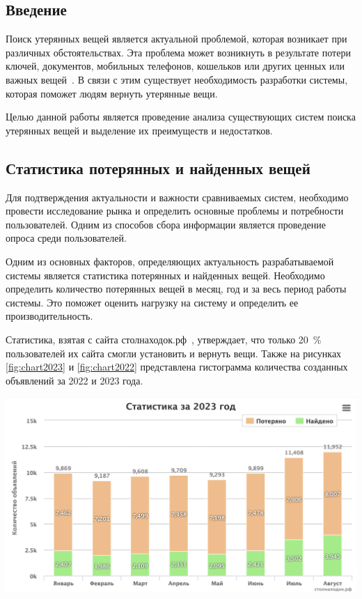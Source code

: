 \documentclass{mirea-article}
\newenvironment{Figure}
{\par\medskip\noindent\minipage{\linewidth}}
{\endminipage\par\medskip}
\begin{document}
	\begin{multicols}{2}
		
		
		\subsection*{Введение}
		\label{sec:introduction}
		
		Поиск утерянных вещей является актуальной проблемой, которая возникает при различных обстоятельствах. Эта проблема может возникнуть в результате потери ключей, документов, мобильных телефонов, кошельков или других ценных или важных вещей~\cite{bib:m24_losts_article,bib:usinsk_losts_article}. В связи с этим существует необходимость разработки системы, которая поможет людям вернуть утерянные вещи.
		
		Целью данной работы является проведение анализа существующих систем поиска утерянных вещей и выделение их преимуществ и недостатков.
		
		\subsection*{Статистика потерянных и найденных вещей}
		
		Для подтверждения актуальности и важности сравниваемых систем, необходимо провести исследование рынка и определить основные проблемы и потребности пользователей. Одним из способов сбора информации является проведение опроса среди пользователей.
		
		Одним из основных факторов, определяющих актуальность разрабатываемой системы является статистика потерянных и найденных вещей. Необходимо определить количество потерянных вещей в месяц, год и за весь период работы системы. Это поможет оценить нагрузку на систему и определить ее производительность.
		
		Статистика, взятая с сайта столнаходок.рф~\cite{bib:stol_nahodok}, утверждает, что только 20~\% пользователей их сайта смогли установить и вернуть вещи. Также на рисунках \ref{fig:chart2023} и \ref{fig:chart2022} представлена гистограмма количества созданных объявлений за 2022 и 2023 года.
		
		\begin{Figure}
			\centering
			\includegraphics[width=\textwidth]{../images/chart2023}
			\label{fig:chart2023}
		\end{Figure}
	

\end{multicols}
\end{document}

